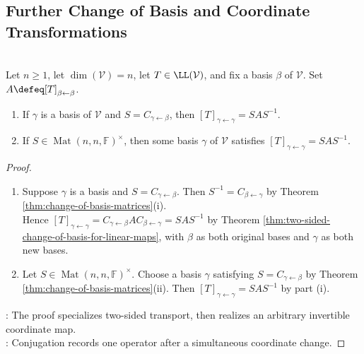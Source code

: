 \subsection{Further Change of Basis and Coordinate Transformations}

\begin{theorem} \label{thm:change-of-basis-formula} \\
Let $n\geq1$, let $\dim(\mathcal{V})=n$, let $T\in\LL(\mathcal{V})$, and fix a basis $\beta$ of $\mathcal{V}$. Set $A\defeq[T]_{\beta\leftarrow\beta}$.
\begin{enumerate}[label=(\roman*)]
\setlength{\itemsep}{0pt}
\item If $\gamma$ is a basis of $\mathcal{V}$ and $S=C_{\gamma\leftarrow\beta}$, then $[T]_{\gamma\leftarrow\gamma}=SAS^{-1}$.
\item If $S\in\operatorname{Mat}(n,n,\mathbb{F})^{\times}$, then some basis $\gamma$ of $\mathcal{V}$ satisfies $[T]_{\gamma\leftarrow\gamma}=SAS^{-1}$.
\end{enumerate}
\begin{proof}
\begin{enumerate}[label=(\roman*)]
\setlength{\itemsep}{0pt}
\item Suppose $\gamma$ is a basis and $S=C_{\gamma\leftarrow\beta}$. Then $S^{-1}=C_{\beta\leftarrow\gamma}$ by Theorem \ref{thm:change-of-basis-matrices}(i).\\
Hence $[T]_{\gamma\leftarrow\gamma}=C_{\gamma\leftarrow\beta}AC_{\beta\leftarrow\gamma}=SAS^{-1}$ by Theorem \ref{thm:two-sided-change-of-basis-for-linear-maps}, with $\beta$ as both original bases and $\gamma$ as both new bases.
\item Let $S\in\operatorname{Mat}(n,n,\mathbb{F})^{\times}$. Choose a basis $\gamma$ satisfying $S=C_{\gamma\leftarrow\beta}$ by Theorem \ref{thm:change-of-basis-matrices}(ii). Then $[T]_{\gamma\leftarrow\gamma}=SAS^{-1}$ by part (i).
\end{enumerate}
: The proof specializes two-sided transport, then realizes an arbitrary invertible coordinate map.\\
: Conjugation records one operator after a simultaneous coordinate change.
\end{proof}
\end{theorem}
